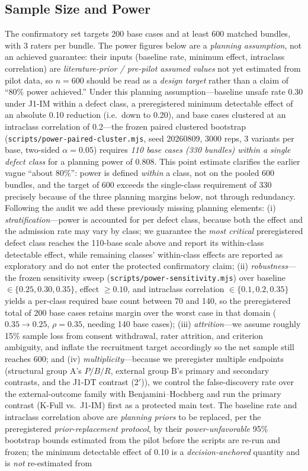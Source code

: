 \documentclass[sigconf,anonymous,review]{acmart}
\begin{document}
\subsection{Sample Size and Power}
The confirmatory set targets 200 base cases and at least 600 matched bundles, with 3 raters per bundle. The power figures below are a \emph{planning assumption}, not an achieved guarantee: their inputs (baseline rate, minimum effect, intraclass correlation) are \emph{literature-prior / pre-pilot assumed values} not yet estimated from pilot data, so $n=600$ should be read as a \emph{design target} rather than a claim of ``80\% power achieved.'' Under this planning assumption---baseline unsafe rate 0.30 under J1-IM within a defect class, a preregistered minimum detectable effect of an absolute 0.10 reduction (i.e.\ down to 0.20), and base cases clustered at an intraclass correlation of 0.2---the frozen paired clustered bootstrap (\texttt{scripts/power-paired-cluster.mjs}, seed 20260809, 3000 reps, 3 variants per base, two-sided $\alpha=0.05$) requires \emph{110 base cases (330 bundles) within a single defect class} for a planning power of $0.808$. This point estimate clarifies the earlier vague ``about 80\%'': power is defined \emph{within} a class, not on the pooled 600 bundles, and the target of 600 exceeds the single-class requirement of 330 precisely because of the three planning margins below, not through redundancy. Following the audit we add these previously missing planning elements: (i) \emph{stratification}---power is accounted for per defect class, because both the effect and the admission rate may vary by class; we guarantee the \emph{most critical} preregistered defect class reaches the 110-base scale above and report its within-class detectable effect, while remaining classes' within-class effects are reported as exploratory and do not enter the protected confirmatory claim; (ii) \emph{robustness}---the frozen sensitivity sweep (\texttt{scripts/power-sensitivity.mjs}) over baseline $\in\{0.25,0.30,0.35\}$, effect $\geq 0.10$, and intraclass correlation $\in\{0.1,0.2,0.35\}$ yields a per-class required base count between 70 and 140, so the preregistered total of 200 base cases retains margin over the worst case in that domain ($0.35\!\to\!0.25$, $\rho=0.35$, needing 140 base cases); (iii) \emph{attrition}---we assume roughly 15\% sample loss from consent withdrawal, rater attrition, and criterion ambiguity, and inflate the recruitment target accordingly so the net sample still reaches 600; and (iv) \emph{multiplicity}---because we preregister multiple endpoints (structural group A's $P/B/R$, external group B's primary and secondary contrasts, and the J1-DT contrast (2$'$)), we control the false-discovery rate over the external-outcome family with Benjamini--Hochberg and run the primary contrast (K-Full vs.\ J1-IM) first as a protected main test. The baseline rate and intraclass correlation above are \emph{planning priors} to be replaced, per the preregistered \emph{prior-replacement protocol}, by their \emph{power-unfavorable} 95\% bootstrap bounds estimated from the pilot before the scripts are re-run and frozen; the minimum detectable effect of 0.10 is a \emph{decision-anchored} quantity and is \emph{not} re-estimated from 
\end{document}

